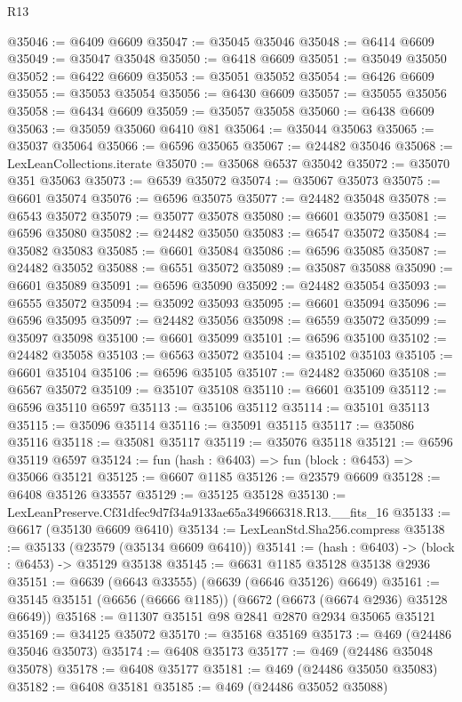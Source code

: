 \begin{lexlean}{R13}
\begin{coremodule}
@35046 := @6409 @6609
@35047 := @35045 @35046
@35048 := @6414 @6609
@35049 := @35047 @35048
@35050 := @6418 @6609
@35051 := @35049 @35050
@35052 := @6422 @6609
@35053 := @35051 @35052
@35054 := @6426 @6609
@35055 := @35053 @35054
@35056 := @6430 @6609
@35057 := @35055 @35056
@35058 := @6434 @6609
@35059 := @35057 @35058
@35060 := @6438 @6609
@35063 := @35059 @35060 @6410 @81
@35064 := @35044 @35063
@35065 := @35037 @35064
@35066 := @6596 @35065
@35067 := @24482 @35046
@35068 := LexLeanCollections.iterate
@35070 := @35068 @6537 @35042
@35072 := @35070 @351 @35063
@35073 := @6539 @35072
@35074 := @35067 @35073
@35075 := @6601 @35074
@35076 := @6596 @35075
@35077 := @24482 @35048
@35078 := @6543 @35072
@35079 := @35077 @35078
@35080 := @6601 @35079
@35081 := @6596 @35080
@35082 := @24482 @35050
@35083 := @6547 @35072
@35084 := @35082 @35083
@35085 := @6601 @35084
@35086 := @6596 @35085
@35087 := @24482 @35052
@35088 := @6551 @35072
@35089 := @35087 @35088
@35090 := @6601 @35089
@35091 := @6596 @35090
@35092 := @24482 @35054
@35093 := @6555 @35072
@35094 := @35092 @35093
@35095 := @6601 @35094
@35096 := @6596 @35095
@35097 := @24482 @35056
@35098 := @6559 @35072
@35099 := @35097 @35098
@35100 := @6601 @35099
@35101 := @6596 @35100
@35102 := @24482 @35058
@35103 := @6563 @35072
@35104 := @35102 @35103
@35105 := @6601 @35104
@35106 := @6596 @35105
@35107 := @24482 @35060
@35108 := @6567 @35072
@35109 := @35107 @35108
@35110 := @6601 @35109
@35112 := @6596 @35110 @6597
@35113 := @35106 @35112
@35114 := @35101 @35113
@35115 := @35096 @35114
@35116 := @35091 @35115
@35117 := @35086 @35116
@35118 := @35081 @35117
@35119 := @35076 @35118
@35121 := @6596 @35119 @6597
@35124 := fun (hash : @6403) => fun (block : @6453) => @35066 @35121
@35125 := @6607 @1185
@35126 := @23579 @6609
@35128 := @6408 @35126 @33557
@35129 := @35125 @35128
@35130 := LexLeanPreserve.Cf31dfec9d7f34a9133ae65a349666318.R13.__fits_16
@35133 := @6617 (@35130 @6609 @6410)
@35134 := LexLeanStd.Sha256.compress
@35138 := @35133 (@23579 (@35134 @6609 @6410))
@35141 := (hash : @6403) -> (block : @6453) -> @35129 @35138
@35145 := @6631 @1185 @35128 @35138 @2936
@35151 := @6639 (@6643 @33555) (@6639 (@6646 @35126) @6649)
@35161 := @35145 @35151 (@6656 (@6666 @1185)) (@6672 (@6673 (@6674 @2936) @35128 @6649))
@35168 := @11307 @35151 @98 @2841 @2870 @2934 @35065 @35121
@35169 := @34125 @35072
@35170 := @35168 @35169
@35173 := @469 (@24486 @35046 @35073)
@35174 := @6408 @35173
@35177 := @469 (@24486 @35048 @35078)
@35178 := @6408 @35177
@35181 := @469 (@24486 @35050 @35083)
@35182 := @6408 @35181
@35185 := @469 (@24486 @35052 @35088)

\end{coremodule}
\end{lexlean}
